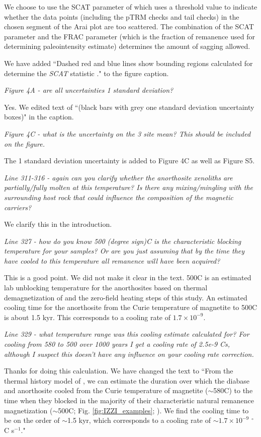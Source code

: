 \documentclass[11pt, letterpaper]{article}
\begin{document}
\begin{flushleft}
We choose to use the SCAT parameter of \cite{Tauxe2004a} which uses a threshold value to indicate whether the data points (including the pTRM checks and tail checks) in the chosen segment of the Arai plot are too scattered. The combination of the SCAT parameter and the FRAC parameter (which is the fraction of remanence used for determining paleointensity estimate) determines the amount of sagging allowed.

We have added ``Dashed red and blue lines show bounding regions calculated for determine the \textit{SCAT} statistic \cite{Shaar2013a}." to the figure caption.

\textit{Figure 4A - are all uncertainties 1 standard deviation?}

Yes. We edited text of ``(black bars with grey one standard deviation uncertainty boxes)" in the caption.

\textit{Figure 4C - what is the uncertainty on the 3 site mean? This should be included on the figure.}

The 1 standard deviation uncertainty is added to Figure 4C as well as Figure S5.

\textit{Line 311-316 - again can you clarify whether the anorthosite xenoliths are partially/fully molten at this temperature? Is there any mixing/mingling with the surrounding host rock that could influence the composition of the magnetic carriers?}

We clarify this in the introduction.  

\textit{Line 327 - how do you know 500 (degree sign)C is the characteristic blocking temperature for your samples? Or are you just assuming that by the time they have cooled to this temperature all remanence will have been acquired?}

This is a good point. We did not make it clear in the text. 500\textdegree C is an estimated lab unblocking temperature for the anorthosites based on thermal demagnetization of \cite{Zhang2021b} and the zero-field heating steps of this study. An estimated cooling time for the anorthosite from the Curie temperature of magnetite to 500\textdegree C is about 1.5 kyr. This corresponds to a cooling rate of $1.7\times10^{-9}$. 

\textit{Line 329 - what temperature range was this cooling estimate calculated for? For cooling from 580 to 500 over 1000 years I get a cooling rate of 2.5e-9 C\/s, although I suspect this doesn't have any influence on your cooling rate correction.}

Thanks for doing this calculation. We have changed the text to ``From the thermal history model of \cite{Zhang2021b}, we can estimate the duration over which the diabase and anorthosite cooled from the Curie temperature of magnetite ($\sim$580\textdegree C) to the time when they blocked in the majority of their characteristic natural remanence magnetization ($\sim$500\textdegree  C; Fig. \ref{fig:IZZI_examples}; \citealp{Zhang2021b}). We find the cooling time to be on the order of $\sim$1.5 kyr, which corresponds to a cooling rate of $\sim1.7\times10^{-9}$ $^\circ$C s$^{-1}$."


\end{flushleft}
\end{document}
